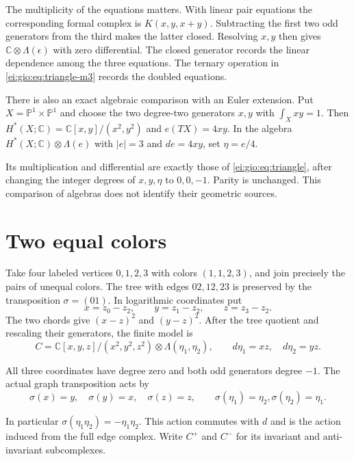 \begin{remark}\label{ei:gio:rem:linear-and-euler}
The multiplicity of the equations matters. With linear
pair equations the corresponding formal complex is
$K(x,y,x+y)$. Subtracting the first two odd generators
from the third makes the latter closed. Resolving $x,y$
then gives $\mathbb C\otimes\Lambda(\epsilon)$ with zero
differential. The closed generator records the linear dependence among the
three equations. The ternary operation in
\eqref{ei:gio:eq:triangle-m3} records the doubled equations.

There is also an exact algebraic comparison with an Euler
extension. Put $X=\mathbb P^1\times\mathbb P^1$ and choose
the two degree-two generators $x,y$ with $\int_Xxy=1$.
Then $H^*(X;\mathbb C)=\mathbb C[x,y]/(x^2,y^2)$ and
$e(TX)=4xy$. In the algebra
$H^*(X;\mathbb C)\otimes\Lambda(e)$ with $|e|=3$ and
$de=4xy$, set $\eta=e/4$.

Its multiplication and
differential are exactly those of \eqref{ei:gio:eq:triangle},
after changing the integer degrees of $x,y,\eta$ to
$0,0,-1$. Parity is unchanged. This comparison of
algebras does not identify their geometric sources.
\end{remark}

\section{Two equal colors}

Take four labeled vertices $0,1,2,3$ with colors
$(1,1,2,3)$, and join precisely the pairs of unequal
colors. The tree with edges $02,12,23$ is preserved
by the transposition $\sigma=(01)$. In logarithmic
coordinates put
\[
 x=z_0-z_2,\qquad y=z_1-z_2,\qquad z=z_3-z_2.
\]
The two chords give $(x-z)^2$ and $(y-z)^2$.
After the tree quotient and rescaling their generators,
the finite model is
\begin{equation}\label{ei:gio:eq:repeated-color}
 C=\mathbb C[x,y,z]/(x^2,y^2,z^2)
           \otimes\Lambda(\eta_1,\eta_2),
 \qquad d\eta_1=xz,\quad d\eta_2=yz.
\end{equation}

All three coordinates have degree zero and both odd
generators degree $-1$. The actual graph transposition
acts by
\[
 \sigma(x)=y,\quad\sigma(y)=x,\quad\sigma(z)=z,
 \qquad\sigma(\eta_1)=\eta_2,
       \sigma(\eta_2)=\eta_1.
\]

In particular $\sigma(\eta_1\eta_2)=-\eta_1\eta_2$.
This action commutes with $d$ and is the action induced
from the full edge complex. Write $C^+$ and $C^-$ for
its invariant and anti-invariant subcomplexes.

